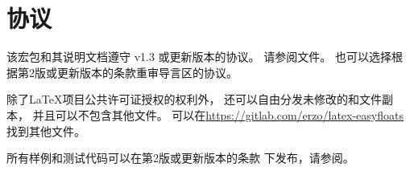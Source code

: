 
\section{协议}
\label{license}

该宏包和其说明文档遵守 v1.3 或更新版本的协议。
请参阅文件。
也可以选择根据第2版或更新版本的条款重审导言区的协议。

除了\LaTeX{}项目公共许可证授权的权利外，
还可以自由分发未修改的和文件副本，
并且可以不包含其他文件。
可以在\url{https://gitlab.com/erzo/latex-easyfloats}
找到其他文件。

所有样例和测试代码可以在第2版或更新版本的条款
下发布，请参阅。
